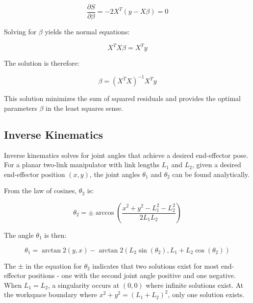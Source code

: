 \[
\frac{\partial S}{\partial \beta} = -2X^T(y - X\beta) = 0
\]

Solving for \(\beta\) yields the normal equations:

\[
X^TX\beta = X^Ty
\]

The solution is therefore:

\[
\beta = (X^TX)^{-1}X^Ty
\]

This solution minimizes the sum of squared residuals and provides the optimal parameters \(\beta\) in the least squares sense.

\subsection{Inverse Kinematics}
Inverse kinematics solves for joint angles that achieve a desired end-effector pose. For a planar two-link manipulator with link lengths \(L_1\) and \(L_2\), given a desired end-effector position \((x,y)\), the joint angles \(\theta_1\) and \(\theta_2\) can be found analytically.

From the law of cosines, \(\theta_2\) is:

\[
\theta_2 = \pm \arccos\left(\frac{x^2 + y^2 - L_1^2 - L_2^2}{2L_1L_2}\right)
\]

The angle \(\theta_1\) is then:

\[
\theta_1 = \arctan2(y,x) - \arctan2(L_2\sin(\theta_2), L_1 + L_2\cos(\theta_2))
\]

The ± in the equation for \(\theta_2\) indicates that two solutions exist for most end-effector positions - one with the second joint angle positive and one negative. When \(L_1 = L_2\), a singularity occurs at \((0,0)\) where infinite solutions exist. At the workspace boundary where \(x^2 + y^2 = (L_1 + L_2)^2\), only one solution exists.


